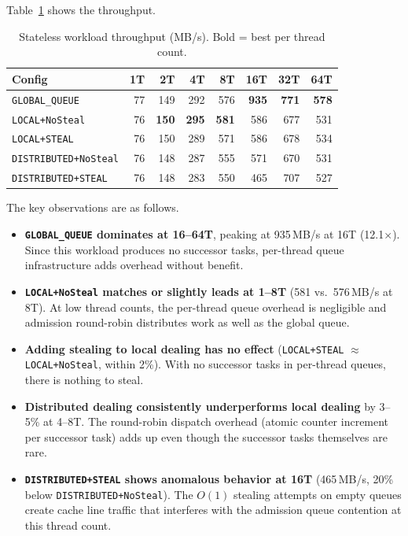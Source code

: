 Table~\ref{tab:ds-stateless} shows the throughput.

\begin{table}[h]
\centering
\caption{Stateless workload throughput (MB/s). Bold = best per thread count.}
\label{tab:ds-stateless}
\begin{tabular}{l|rrrrrrr}
\hline
\textbf{Config} & \textbf{1T} & \textbf{2T} & \textbf{4T} & \textbf{8T} & \textbf{16T} & \textbf{32T} & \textbf{64T} \\
\hline
\texttt{GLOBAL\_QUEUE}       & 77 & 149 & 292 & 576 & \textbf{935} & \textbf{771} & \textbf{578} \\
\texttt{LOCAL+NoSteal}       & 76 & \textbf{150} & \textbf{295} & \textbf{581} & 586 & 677 & 531 \\
\texttt{LOCAL+STEAL}         & 76 & 150 & 289 & 571 & 586 & 678 & 534 \\
\texttt{DISTRIBUTED+NoSteal} & 76 & 148 & 287 & 555 & 571 & 670 & 531 \\
\texttt{DISTRIBUTED+STEAL}   & 76 & 148 & 283 & 550 & 465 & 707 & 527 \\
\hline
\end{tabular}
\end{table}

The key observations are as follows.
%
\begin{itemize}
    \item \textbf{\texttt{GLOBAL\_QUEUE} dominates at 16--64T}, peaking at 935\,MB/s at 16T (12.1$\times$).
    Since this workload produces no successor tasks, per-thread queue infrastructure adds overhead without benefit.

    \item \textbf{\texttt{LOCAL+NoSteal} matches or slightly leads at 1--8T} (581 vs.\ 576\,MB/s at 8T).
    At low thread counts, the per-thread queue overhead is negligible and admission round-robin distributes work as well as the global queue.

    \item \textbf{Adding stealing to local dealing has no effect} (\texttt{LOCAL+STEAL} $\approx$ \texttt{LOCAL+NoSteal}, within 2\%).
    With no successor tasks in per-thread queues, there is nothing to steal.

    \item \textbf{Distributed dealing consistently underperforms local dealing} by 3--5\% at 4--8T.
    The round-robin dispatch overhead (atomic counter increment per successor task) adds up even though the successor tasks themselves are rare.

    \item \textbf{\texttt{DISTRIBUTED+STEAL} shows anomalous behavior at 16T} (465\,MB/s, 20\% below \texttt{DISTRIBUTED+NoSteal}).
    The $O(1)$ stealing attempts on empty queues create cache line traffic that interferes with the admission queue contention at this thread count.
\end{itemize}

